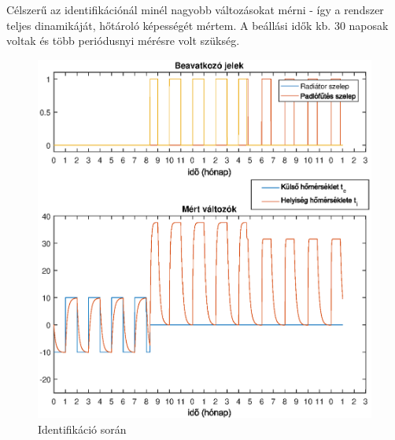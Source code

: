 Célszerű az identifikációnál minél nagyobb változásokat mérni - így a rendszer teljes dinamikáját, hőtároló képességét mértem. A beállási idők kb. 30 naposak voltak és több periódusnyi mérésre volt szükség. 







\begin{figure}[H]
	\centering
	\includegraphics[trim=0 0 0 0, clip,width=\textwidth]{figures/ident-valve3}
	\caption{Identifikáció során }
	\label{fig:ident}
\end{figure}

